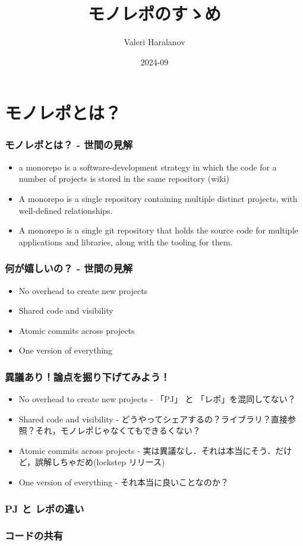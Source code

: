 \documentclass{beamer}
\title{モノレポのすゝめ}
\author{Valeri Haralanov}
\institute{無所属}
\date{2024-09}
\begin{document}
\frame{\titlepage}


\section{モノレポとは？}
\begin{frame}
\frametitle{モノレポとは？ - 世間の見解}
\begin{itemize}
    \item a monorepo is a software-development strategy in which the code for a number of projects is stored in the same repository (wiki)
    \item A monorepo is a single repository containing multiple distinct projects, with well-defined relationships.
    \item A monorepo is a single git repository that holds the source code for multiple applications and libraries, along with the tooling for them.
\end{itemize}

\end{frame}

\begin{frame}
\frametitle{何が嬉しいの？ - 世間の見解}

\begin{itemize}
    \item No overhead to create new projects
    \item Shared code and visibility
    \item Atomic commits across projects
    \item One version of everything
\end{itemize}
\end{frame}

\begin{frame}
    \frametitle{異議あり！論点を掘り下げてみよう！}
    \begin{itemize}
        \item No overhead to create new projects - 「PJ」 と 「レポ」を混同してない？
        \item Shared code and visibility - どうやってシェアするの？ライブラリ？直接参照？それ，モノレポじゃなくてもできるくない？
        \item Atomic commits across projects - 実は異議なし．それは本当にそう．だけど，誤解しちゃだめ(lockstep リリース)
        \item One version of everything - それ本当に良いことなのか？
    \end{itemize}
\end{frame}

\begin{frame}
    \frametitle{PJ と レポの違い}
\end{frame}

\begin{frame}
    \frametitle{コードの共有}
\end{frame}

\begin{frame}
    \frametitle{}
\end{frame}
\end{document}
